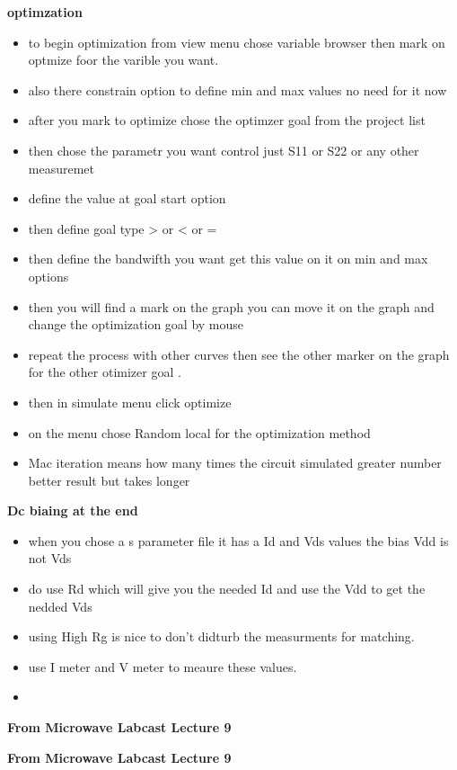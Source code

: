 \documentclass{article}
\begin{document}
\textbf{optimzation}
\begin{itemize}
    \item to begin optimization from  view menu chose variable browser then mark on optmize foor the varible you want.
    \item  also there constrain option to define min and max values no need for it now
    \item after you mark to optimize chose the optimzer goal from the project list 
    \item then chose the parametr you want control just S11 or S22  or any other measuremet 
    \item define the value at goal start option
    \item then define goal type > or < or = 
    \item then define the bandwifth you want get this value on it on min and max options 
    \item then you will find a mark on the graph you can move it on the graph and change the optimization goal  by mouse
    \item repeat the process with other curves then see the other marker on the graph for the other otimizer goal .
    \item then in simulate menu click optimize 
    \item on the menu chose Random local for the optimization method 
    \item Mac iteration means how many times the circuit simulated greater number better result but takes longer  

\end{itemize} 


\textbf{Dc biaing at the end}
\begin{itemize}
    \item when you chose a s parameter file it has a  Id and Vds values the bias Vdd is not Vds 
    \item do  use Rd which will give you the needed Id and use the Vdd to get the nedded Vds 
    \item using High Rg is nice to don't didturb the measurments for matching.
    \item use I meter and V meter to meaure these values.
    \item 
\end{itemize}


\textbf{From Microwave Labcast Lecture 9}

\textbf{From Microwave Labcast Lecture 9}
\end{document}
